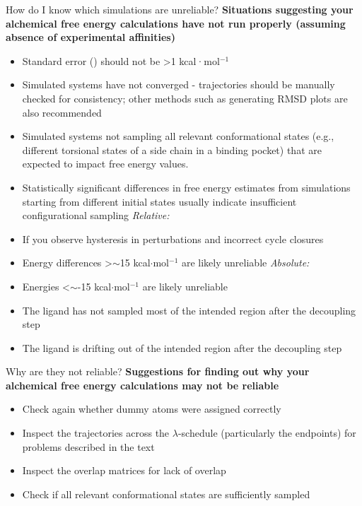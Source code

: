 \documentclass[9pt,bestpractices]{livecoms}
\begin{document}
\begin{Checklists*}
\begin{checklist}{How do I know which simulations are unreliable?}
    \textbf{Situations suggesting your alchemical free energy calculations have not run properly (assuming absence of experimental affinities)}
        \begin{itemize}
                \item Standard error (\textsigma) should not be \textgreater1 kcal·mol$^{-1}$ 
    \item Simulated systems have not converged - trajectories should be manually checked for consistency; other methods such as generating RMSD plots are also recommended
    \item Simulated systems not sampling all relevant conformational states (e.g., different torsional states of a side chain in a binding pocket) that are expected to impact free energy values.
    \item Statistically significant differences in free energy estimates from simulations starting from different initial states usually indicate insufficient configurational sampling
    \newline\newline\textit{Relative:}
    \item If you observe hysteresis in perturbations and incorrect cycle closures
    \item Energy differences \textgreater$\sim$15 kcal$\cdot$mol$^{-1}$  are likely unreliable
    \newline\newline\textit{Absolute:}
    \item Energies \textless$\sim$-15 kcal$\cdot$mol$^{-1}$  are likely unreliable
    \item The ligand has not sampled most of the intended region after the decoupling step
    \item The ligand is drifting out of the intended region after the decoupling step
        \end{itemize}
\end{checklist}

\begin{checklist}{Why are they not reliable?}
    \textbf{Suggestions for finding out why your alchemical free energy calculations may not be reliable}
\begin{itemize}
    \item Check again whether dummy atoms were assigned correctly
    \item Inspect the trajectories across the $\lambda$-schedule (particularly the endpoints) for problems described in the text
    \item Inspect the overlap matrices for lack of overlap
    \item Check if all relevant conformational states are sufficiently sampled 
\end{itemize}
\end{checklist}


\end{Checklists*}
\end{document}

